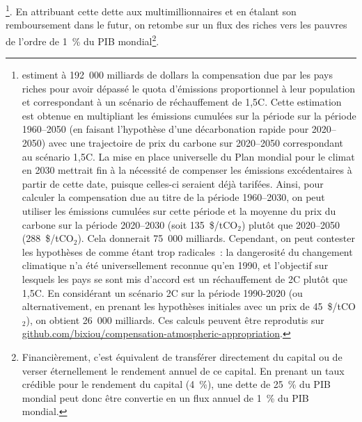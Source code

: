 \documentclass[a5paper,french,openany]{memoir}
\begin{document}
\footnote{\cite{fanning_compensation_2023} estiment à 192~000 milliards de dollars la compensation due par les pays riches pour avoir dépassé le quota d'émissions proportionnel à leur population et correspondant à un scénario de réchauffement de 1,5\textdegree{}C. Cette estimation est obtenue en multipliant les émissions cumulées sur la période sur la période 1960--2050 (en faisant l'hypothèse d'une décarbonation rapide pour 2020--2050) avec une trajectoire de prix du carbone sur 2020--2050 correspondant au scénario 1,5\textdegree{}C. La mise en place universelle du Plan mondial pour le climat en 2030 mettrait fin à la nécessité de compenser les émissions excédentaires à partir de cette date, puisque celles-ci seraient déjà tarifées. Ainsi, pour calculer la compensation due au titre de la période 1960--2030, on peut utiliser les émissions cumulées sur cette période et la moyenne du prix du carbone sur la période 2020--2030 (soit 135~\$/tCO$_\text{2}$) plutôt que 2020--2050 (288~\$/tCO$_\text{2}$). Cela donnerait 75~000 milliards. Cependant, on peut contester les hypothèses de \cite{fanning_compensation_2023} comme étant trop radicales~: la dangerosité du changement climatique n'a été universellement reconnue qu'en 1990, et l'objectif sur lesquels les pays se sont mis d'accord est un réchauffement de 2\textdegree{}C plutôt que 1,5\textdegree{}C. En considérant un scénario 2\textdegree{}C sur la période 1990-2020 (ou alternativement, en prenant les hypothèses initiales avec un prix de 45~\$/tCO$_\text{2}$), on obtient 26~000 milliards. Ces calculs peuvent être reprodutis sur \href{https://github.com/bixiou/compensation-atmospheric-appropriation}{github.com/bixiou/compensation-atmospheric-appropriation}.}. 
En attribuant cette dette aux multimillionnaires et en étalant son remboursement dans le futur, on retombe sur un flux des riches vers les pauvres de l'ordre de 1~\% du PIB mondial\footnote{Financièrement, c'est équivalent de transférer directement du capital ou de verser éternellement le rendement annuel de ce capital. En prenant un taux crédible pour le rendement du capital (4~\%), une dette de 25~\% du PIB mondial peut donc être convertie en un flux annuel de 1~\% du PIB mondial.
}. 
\end{document}
